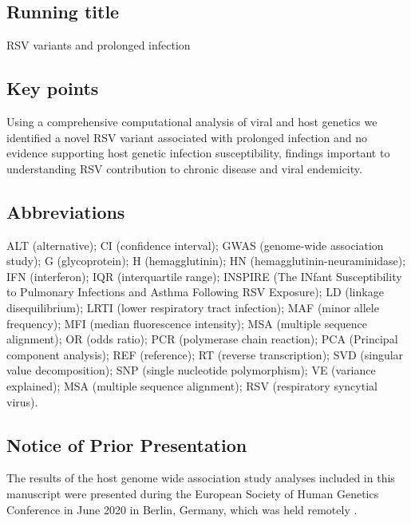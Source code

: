 \documentclass{article} %
\makeatletter
\renewcommand{\maketitle}{\bgroup\setlength{\parindent}{0pt}
\begin{flushleft}
  \textbf{\@title}

  \@author
\end{flushleft}\egroup
}
\makeatother
\begin{document}
\maketitle


\linenumbers
\subsection*{Running title}
RSV variants and prolonged infection 
 
\subsection*{Key points}
Using a comprehensive computational analysis of viral and host genetics we identified a novel RSV variant associated with prolonged infection and no evidence supporting host genetic infection susceptibility, findings important to understanding RSV contribution to chronic disease and viral endemicity. 

\subsection*{Abbreviations}
ALT (alternative); CI (confidence interval); GWAS (genome-wide association study); G (glycoprotein); H (hemagglutinin); HN (hemagglutinin-neuraminidase); IFN (interferon); IQR (interquartile range); INSPIRE (The INfant Susceptibility to Pulmonary Infections and Asthma Following RSV Exposure); LD (linkage disequilibrium); LRTI (lower respiratory tract infection); MAF (minor allele frequency); MFI (median fluorescence intensity); MSA (multiple sequence alignment); OR (odds ratio); PCR (polymerase chain reaction); PCA (Principal component analysis); REF (reference); RT (reverse transcription); SVD (singular value decomposition); SNP (single nucleotide polymorphism); VE (variance explained); MSA (multiple sequence alignment); RSV (respiratory syncytial virus).

\subsection*{Notice of Prior Presentation}
The results of the host genome wide association study analyses included in this manuscript were presented during the European Society of Human Genetics Conference in June 2020 in Berlin, Germany, which was held remotely 
\citep{lawless2020genome}.
\end{document}
